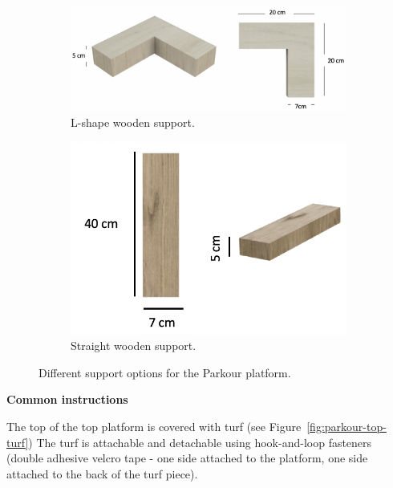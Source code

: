 {\begin{figure}[htb]
  \begin{subfigure}{.45\textwidth}
    \centering
    \includegraphics[width=\textwidth]{img/parkour/option1_support}
    \caption{L-shape wooden support.}
    \label{fig:parkour-option1-support}
  \end{subfigure}
  \hfill
  \begin{subfigure}{.45\textwidth}
    \centering
    \includegraphics[width=\textwidth]{img/parkour/option2_support}
    \caption{Straight wooden support.}
    \label{fig:parkour-option2-support}
  \end{subfigure}
  \caption{Different support options for the Parkour platform.}
\end{figure}

\bigskip

{\bfseries Common instructions}

\headlinebox

The top of the top platform is covered with turf
(see Figure~\ref{fig:parkour-top-turf})
The turf is attachable and detachable using hook-and-loop fasteners
(double adhesive velcro tape - one side attached to the platform,
one side attached to the back of the turf piece). 

}
